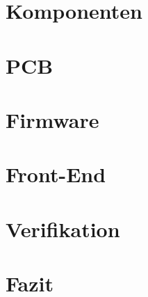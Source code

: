 \documentclass{fhnwreport/fhnwreport}
\begin{document}
\clearpage
\section{Komponenten}
\label{sec:components}



\clearpage
\section{PCB}
\label{sec:pcb}



\clearpage
\section{Firmware}
\label{sec:firmware}


\clearpage
\section{Front-End}
\label{sec:frontend}



\clearpage
\section{Verifikation}
\label{sec:verification}



\clearpage
\section{Fazit}
\label{sec:conclusion}

\end{document}
